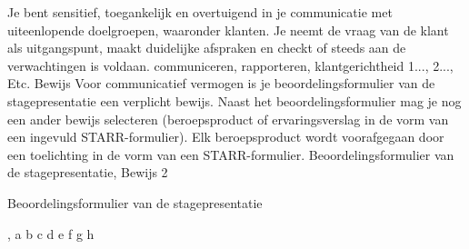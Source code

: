 
\competentie
{%
	\competentieformulier
	{%
		Je bent sensitief, toegankelijk en overtuigend in je communicatie met uiteenlopende doelgroepen, waaronder klanten. Je neemt de vraag van de klant als uitgangspunt, maakt duidelijke afspraken en checkt of steeds aan de verwachtingen is voldaan.
	}
	{%
		communiceren,%
		rapporteren,%
		klantgerichtheid%
	}
	{%
		1...,%
		2...,%
		Etc.%
	}
	{%
		Bewijs
	}
	{%
		Voor communicatief vermogen is je beoordelingsformulier van de stagepresentatie een verplicht bewijs. Naast het beoordelingsformulier mag je nog een ander bewijs selecteren (beroepsproduct of ervaringsverslag in de vorm van een ingevuld STARR-formulier). Elk beroepsproduct wordt voorafgegaan door een toelichting in de vorm van een STARR-formulier.
	}
	{%
		Beoordelingsformulier van de stagepresentatie,%
		Bewijs 2%
	}
}
{%
	\bewijs
	{%
		Beoordelingsformulier van de stagepresentatie
	}
	{}
	{%
		
	},
	\bewijs
	{%
		a
	}
	{%
		\starr
		{%
			b
		}
		{%
			c
		}
		{%
			d
		}
		{%
			e
		}
		{%
			f
		}
		{%
			g
		}
		{%
			h
		}
	}
	{%
		
	}
}
